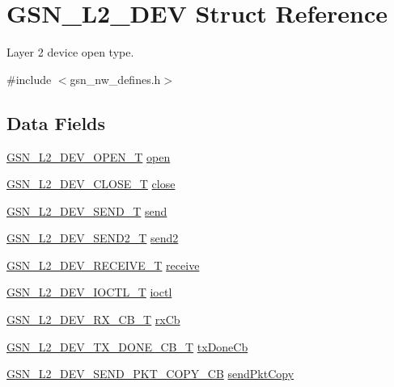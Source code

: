 \hypertarget{a00107}{
\section{GSN\_\-L2\_\-DEV Struct Reference}
\label{a00107}
}


Layer 2 device open type.  




{\ttfamily \#include $<$gsn\_\-nw\_\-defines.h$>$}

\subsection*{Data Fields}
\begin{DoxyCompactItemize}
\item 
\hyperlink{a00670_gaea3ffbbb6ea57c5335f9011b4dcfe651}{GSN\_\-L2\_\-DEV\_\-OPEN\_\-T} \hyperlink{a00107_a62bed8fd3babf97e0d6dce6f4dd163e1}{open}
\item 
\hyperlink{a00670_ga76681abc89c36ea37c57cedb070f1ec2}{GSN\_\-L2\_\-DEV\_\-CLOSE\_\-T} \hyperlink{a00107_a92702f236d576e1cf7f87031261275ec}{close}
\item 
\hyperlink{a00670_gab40e032c5bca66cf4f59d6c8cfa82e0a}{GSN\_\-L2\_\-DEV\_\-SEND\_\-T} \hyperlink{a00107_a2cb8dfa5211ddbb0a75a3267e6330aaa}{send}
\item 
\hyperlink{a00670_ga6bea88ae2a22023e68f1b064e1455411}{GSN\_\-L2\_\-DEV\_\-SEND2\_\-T} \hyperlink{a00107_a2b201aa3cc79e63d197b25770d1936bc}{send2}
\item 
\hyperlink{a00670_gaffd1598183dbe1898e975c2993aa4966}{GSN\_\-L2\_\-DEV\_\-RECEIVE\_\-T} \hyperlink{a00107_ae8f5ffcd1fb58ffea839d087f0c36ec1}{receive}
\item 
\hyperlink{a00670_gaeb9c0acdcf9376e138e61f00a424042a}{GSN\_\-L2\_\-DEV\_\-IOCTL\_\-T} \hyperlink{a00107_ab88d33546af7b71faeb7d6cb14ef8a64}{ioctl}
\item 
\hyperlink{a00670_ga528d617c85be4b1aed82ce677f941587}{GSN\_\-L2\_\-DEV\_\-RX\_\-CB\_\-T} \hyperlink{a00107_a794049b9b975b0c75952070fb5a6494a}{rxCb}
\item 
\hyperlink{a00670_ga4d5db18667f665fc99ec6171cf27b5be}{GSN\_\-L2\_\-DEV\_\-TX\_\-DONE\_\-CB\_\-T} \hyperlink{a00107_a324e49e4a2f3b96e1d133de0a806b580}{txDoneCb}
\item 
\hyperlink{a00670_ga6c639d0fa9b75482d68bfa97834a0ca9}{GSN\_\-L2\_\-DEV\_\-SEND\_\-PKT\_\-COPY\_\-CB} \hyperlink{a00107_afef5ae09a07b0121ce23d69ccaac9470}{sendPktCopy}
\end{DoxyCompactItemize}


